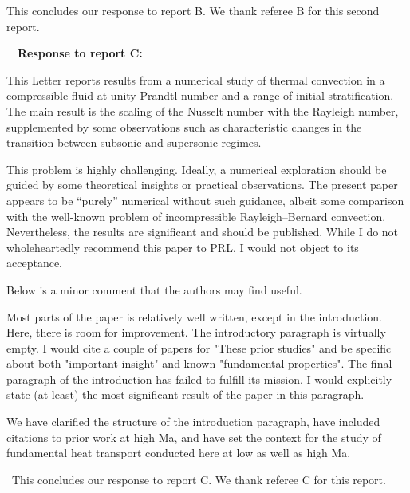 \documentclass[aps, 11pt, singlecolumn]{revtex4-1} %
\begin{document}
\begin{singlespace}
\noindent
This concludes our response to report B.  We thank referee B for this second report.




$\,$
\newline
$\,$
\newline
\noindent
\Large{\textbf{Response to report C:}}\newline$\,$\newline\indent

\begin{myquotation}
This Letter reports results from a numerical study of thermal
convection in a compressible fluid at unity Prandtl number and a range
of initial stratification. The main result is the scaling of the
Nusselt number with the Rayleigh number, supplemented by some
observations such as characteristic changes in the transition between
subsonic and supersonic regimes.

This problem is highly challenging. Ideally, a numerical exploration
should be guided by some theoretical insights or practical
observations. The present paper appears to be ``purely'' numerical
without such guidance, albeit some comparison with the well-known
problem of incompressible Rayleigh--Bernard convection. Nevertheless,
the results are significant and should be published. While I do not
wholeheartedly recommend this paper to PRL, I would not object to its
acceptance.

Below is a minor comment that the authors may find useful.

Most parts of the paper is relatively well written, except in the
introduction. Here, there is room for improvement. The introductory
paragraph is virtually empty. I would cite a couple of papers for
"These prior studies" and be specific about both "important insight"
and known "fundamental properties". The final paragraph of the
introduction has failed to fulfill its mission. I would explicitly
state (at least) the most significant result of the paper in this
paragraph.
\end{myquotation}
We have clarified the structure of the introduction paragraph, have included
citations to prior work at high Ma, and have set the context for the study
of fundamental heat transport conducted here at low as well as high Ma.

$\,$\newline\noindent
This concludes our response to report C.  We thank referee C for this report.

$\,$
\newline
\noindent


\end{singlespace}





\end{document}
